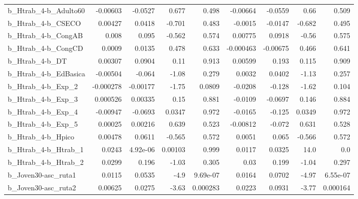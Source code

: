 \begin{tabular}{lrrrrrrrr}
b\_Htrab\_4-b\_Adulto60       &    -0.00603 &      -0.0527 &    0.677 &    0.498 &   -0.00664 &     -0.0559 &         0.66 &         0.509 \\
b\_Htrab\_4-b\_CSECO          &     0.00427 &       0.0418 &   -0.701 &    0.483 &    -0.0015 &     -0.0147 &       -0.682 &         0.495 \\
b\_Htrab\_4-b\_CongAB         &       0.008 &        0.095 &   -0.562 &    0.574 &    0.00775 &      0.0918 &        -0.56 &         0.575 \\
b\_Htrab\_4-b\_CongCD         &      0.0009 &       0.0135 &    0.478 &    0.633 &  -0.000463 &    -0.00675 &        0.466 &         0.641 \\
b\_Htrab\_4-b\_DT             &     0.00307 &       0.0904 &     0.11 &    0.913 &    0.00599 &       0.193 &        0.115 &         0.909 \\
b\_Htrab\_4-b\_EdBasica       &    -0.00504 &       -0.064 &    -1.08 &    0.279 &     0.0032 &      0.0402 &        -1.13 &         0.257 \\
b\_Htrab\_4-b\_Exp\_2          &   -0.000278 &     -0.00177 &    -1.75 &   0.0809 &    -0.0208 &      -0.128 &        -1.62 &         0.104 \\
b\_Htrab\_4-b\_Exp\_3          &    0.000526 &      0.00335 &     0.15 &    0.881 &    -0.0109 &     -0.0697 &        0.146 &         0.884 \\
b\_Htrab\_4-b\_Exp\_4          &    -0.00947 &      -0.0693 &   0.0347 &    0.972 &    -0.0165 &      -0.125 &       0.0349 &         0.972 \\
b\_Htrab\_4-b\_Exp\_5          &     0.00025 &      0.00216 &    0.639 &    0.523 &   -0.00812 &      -0.072 &        0.631 &         0.528 \\
b\_Htrab\_4-b\_Hpico          &     0.00478 &       0.0611 &   -0.565 &    0.572 &     0.0051 &       0.065 &       -0.566 &         0.572 \\
b\_Htrab\_4-b\_Htrab\_1        &      0.0243 &     4.92e-06 &  0.00103 &    0.999 &     0.0117 &      0.0325 &         14.0 &           0.0 \\
b\_Htrab\_4-b\_Htrab\_2        &      0.0299 &        0.196 &    -1.03 &    0.305 &       0.03 &       0.199 &        -1.04 &         0.297 \\
b\_Joven30-asc\_ruta1        &      0.0115 &       0.0535 &     -4.9 & 9.69e-07 &     0.0164 &      0.0702 &        -4.97 &      6.55e-07 \\
b\_Joven30-asc\_ruta2        &     0.00625 &       0.0275 &    -3.63 & 0.000283 &     0.0223 &      0.0931 &        -3.77 &      0.000164 \\

\end{tabular}
